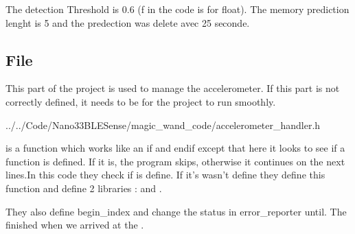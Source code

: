 The detection Threshold is 0.6 (f in the code is for float). The memory prediction lenght is 5 and the predection was delete avec 25 seconde. 

\begin{center}
    \label{Magic Wand Constant}
\end{center}


\subsection{File }

This part of the project is used to manage the accelerometer. If this part is not correctly defined, it needs to be for the project to run smoothly. 

\begin{center}
    \label{Figure:MagicWandAccelerometerhandler}
     {../../Code/Nano33BLESense/magic_wand_code/accelerometer_handler.h}	
\end{center}


 is a function which works like an if and endif except that here it looks to see if a function is defined. If it is, the program skips, otherwise it continues on the next lines.In this code they check if 
 is define. If it's wasn't define they define this function and define 2 libraries :   and  . 

They also define begin\_index and change the status in error\_reporter until. The  finished when we arrived at the .


\subsection{}

\begin{center}
    \label{MagicWandArduinoAccelerometerHandler}		
\end{center}

